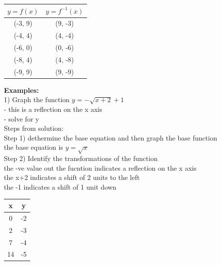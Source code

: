 \documentclass[10pt]{article}
\begin{document}
\begin{tabular}{|c|c|}
    \hline
    $y = f(x)$ & $y = f^{-1}(x)$ \\
    \hline
    (-3, 9)    & (9, -3)         \\
    (-4, 4)    & (4, -4)         \\
    (-6, 0)    & (0, -6)         \\
    (-8, 4)    & (4, -8)         \\
    (-9, 9)    & (9, -9)         \\
    \hline
\end{tabular}




\textbf{Examples: } \\
1) Graph the function \(y=-\sqrt{x+2}+1\) \\
- this is a reflection on the x axis \\
- solve for y \\
Steps from solution: \\
Step 1) dethermine the base equation and then graph the base function \\
the base equation is \(y=\sqrt{x}\) \\
Step 2) Identify the transformations of the function \\
the -ve value out the fucntion indicates a reflection on the x axis \\
the x+2 indicates a shift of 2 units to the left \\
the -1 indicates a shift of 1 unit down

\begin{tabular}{|c|c|}
    \hline
    x  & y  \\
    \hline
    0  & -2 \\
    2  & -3 \\
    7  & -4 \\
    14 & -5 \\
    \hline
\end{tabular}
\end{document}
